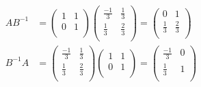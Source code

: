 \documentclass{standalone}
\begin{document}
\begin{enumerate}[a)]
    \begin{align*}
        AB^{-1} &= \left(\begin{array}{rr}
        1 & 1 \\
        0 & 1 \\
        \end{array}\right)\left(\begin{array}{rr}
        \frac{-1}{3} & \frac{1}{3} \\
        \frac{1}{3} & \frac{2}{3} \\
        \end{array}\right) = \left(\begin{array}{rr}
        0 & 1 \\
        \frac{1}{3} & \frac{2}{3} \\
        \end{array}\right) \\
        B^{-1}A &= \left(\begin{array}{rr}
        \frac{-1}{3} & \frac{1}{3} \\
        \frac{1}{3} & \frac{2}{3} \\
        \end{array}\right)\left(\begin{array}{rr}
        1 & 1 \\
        0 & 1 \\
        \end{array}\right) = \left(\begin{array}{rr}
        \frac{-1}{3} & 0 \\
        \frac{1}{3} & 1 \\
        \end{array}\right) \\
    \end{align*}


\end{enumerate}
\end{document}
